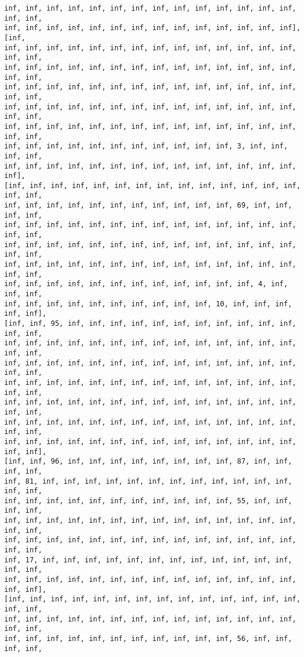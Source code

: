 \documentclass[11pt]{article}
\begin{document}
\begin{Verbatim}[commandchars=\\\{\}]
inf, inf, inf, inf, inf, inf, inf, inf, inf, inf, inf, inf, inf, inf, inf, inf,
inf, inf, inf, inf, inf, inf, inf, inf, inf, inf, inf, inf, inf, inf], [inf,
inf, inf, inf, inf, inf, inf, inf, inf, inf, inf, inf, inf, inf, inf, inf, inf,
inf, inf, inf, inf, inf, inf, inf, inf, inf, inf, inf, inf, inf, inf, inf, inf,
inf, inf, inf, inf, inf, inf, inf, inf, inf, inf, inf, inf, inf, inf, inf, inf,
inf, inf, inf, inf, inf, inf, inf, inf, inf, inf, inf, inf, inf, inf, inf, inf,
inf, inf, inf, inf, inf, inf, inf, inf, inf, inf, inf, inf, inf, inf, inf, inf,
inf, inf, inf, inf, inf, inf, inf, inf, inf, inf, inf, 3, inf, inf, inf, inf,
inf, inf, inf, inf, inf, inf, inf, inf, inf, inf, inf, inf, inf, inf, inf],
[inf, inf, inf, inf, inf, inf, inf, inf, inf, inf, inf, inf, inf, inf, inf, inf,
inf, inf, inf, inf, inf, inf, inf, inf, inf, inf, inf, 69, inf, inf, inf, inf,
inf, inf, inf, inf, inf, inf, inf, inf, inf, inf, inf, inf, inf, inf, inf, inf,
inf, inf, inf, inf, inf, inf, inf, inf, inf, inf, inf, inf, inf, inf, inf, inf,
inf, inf, inf, inf, inf, inf, inf, inf, inf, inf, inf, inf, inf, inf, inf, inf,
inf, inf, inf, inf, inf, inf, inf, inf, inf, inf, inf, inf, 4, inf, inf, inf,
inf, inf, inf, inf, inf, inf, inf, inf, inf, inf, 10, inf, inf, inf, inf, inf],
[inf, inf, 95, inf, inf, inf, inf, inf, inf, inf, inf, inf, inf, inf, inf, inf,
inf, inf, inf, inf, inf, inf, inf, inf, inf, inf, inf, inf, inf, inf, inf, inf,
inf, inf, inf, inf, inf, inf, inf, inf, inf, inf, inf, inf, inf, inf, inf, inf,
inf, inf, inf, inf, inf, inf, inf, inf, inf, inf, inf, inf, inf, inf, inf, inf,
inf, inf, inf, inf, inf, inf, inf, inf, inf, inf, inf, inf, inf, inf, inf, inf,
inf, inf, inf, inf, inf, inf, inf, inf, inf, inf, inf, inf, inf, inf, inf, inf,
inf, inf, inf, inf, inf, inf, inf, inf, inf, inf, inf, inf, inf, inf, inf, inf],
[inf, inf, 96, inf, inf, inf, inf, inf, inf, inf, inf, 87, inf, inf, inf, inf,
inf, 81, inf, inf, inf, inf, inf, inf, inf, inf, inf, inf, inf, inf, inf, inf,
inf, inf, inf, inf, inf, inf, inf, inf, inf, inf, inf, 55, inf, inf, inf, inf,
inf, inf, inf, inf, inf, inf, inf, inf, inf, inf, inf, inf, inf, inf, inf, inf,
inf, inf, inf, inf, inf, inf, inf, inf, inf, inf, inf, inf, inf, inf, inf, inf,
inf, 17, inf, inf, inf, inf, inf, inf, inf, inf, inf, inf, inf, inf, inf, inf,
inf, inf, inf, inf, inf, inf, inf, inf, inf, inf, inf, inf, inf, inf, inf, inf],
[inf, inf, inf, inf, inf, inf, inf, inf, inf, inf, inf, inf, inf, inf, inf, inf,
inf, inf, inf, inf, inf, inf, inf, inf, inf, inf, inf, inf, inf, inf, inf, inf,
inf, inf, inf, inf, inf, inf, inf, inf, inf, inf, inf, 56, inf, inf, inf, inf,

\end{Verbatim}
\end{document}
